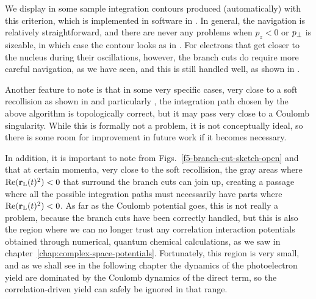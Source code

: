 We display in  some sample integration contours produced (automatically) with this criterion, which is implemented in software in . In general, the navigation is relatively straightforward, and there are never any problems when $p_z<0$ or ${p_{\perp}}$ is sizeable, in which case the contour looks as in . For electrons that get closer to the nucleus during their oscillations, however, the branch cuts do require more careful navigation, as we have seen, and this is still handled well, as shown in .


Another feature to note is that in some very specific cases, very close to a soft recollision as shown in  and particularly , the integration path chosen by the above algorithm is topologically correct, but it may pass very close to a Coulomb singularity. While this is formally not a problem, it is not conceptually ideal, so there is some room for improvement in future work if it becomes necessary.


In addition, it is important to note from Figs.~\ref{f5-branch-cut-sketch-open} and  that at certain momenta, very close to the soft recollision, the gray areas where $\Re(\vb{r}_\mathrm{L}(t)^2)<0$ that surround the branch cuts can join up, creating a passage where all the possible integration paths must necessarily have parts where $\Re(\vb{r}_\mathrm{L}(t)^2)<0$. As far as the Coulomb potential goes, this is not really a problem, because the branch cuts have been correctly handled, but this is also the region where we can no longer trust any correlation interaction potentials obtained through numerical, quantum chemical calculations, as we saw in chapter~\ref{chap:complex-space-potentials}. Fortunately, this region is very small, and as we shall see in the following chapter the dynamics of the photoelectron yield are dominated by the Coulomb dynamics of the direct term, so the correlation-driven yield can safely be ignored in that range.




































   

